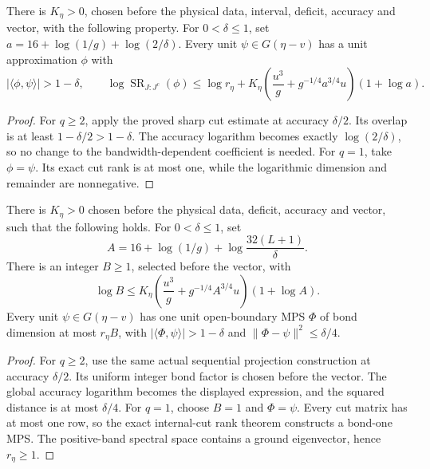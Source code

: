 \begin{lemma}
    \label{lem:ld_sharp_strict_cut_positive_dimension}
    \leanok
    There is $K_\eta>0$, chosen before the physical data, interval,
    deficit, accuracy and vector, with the following property.
    For $0<\delta\le1$, set
    $a=16+\log(1/g)+\log(2/\delta)$.
    Every unit $\psi\in G(\eta-v)$ has a unit approximation $\phi$ with
    \[
        |\langle\phi,\psi\rangle|>1-\delta,\qquad
        \log\operatorname{SR}_{J:J^c}(\phi)
        \le\log r_\eta+
        K_\eta\left(\frac{u^3}{g}+g^{-1/4}a^{3/4}u\right)(1+\log a).
    \]
\end{lemma}
\begin{proof}\leanok
    For $q\ge2$, apply the proved sharp cut estimate at accuracy
    $\delta/2$. Its overlap is at least $1-\delta/2>1-\delta$.
    The accuracy logarithm becomes exactly $\log(2/\delta)$, so no
    change to the bandwidth-dependent coefficient is needed.
    For $q=1$, take $\phi=\psi$. Its exact cut rank is at most one,
    while the logarithmic dimension and remainder are nonnegative.
\end{proof}

\begin{lemma}
    \label{lem:ld_sharp_strict_mps_positive_dimension}
    \leanok
    There is $K_\eta>0$ chosen before the physical data, deficit,
    accuracy and vector, such that the following holds.
    For $0<\delta\le1$, set
    \[
        A=16+\log(1/g)+\log\frac{32(L+1)}\delta.
    \]
    There is an integer $B\ge1$, selected before the vector, with
    \[
        \log B\le K_\eta
        \left(\frac{u^3}{g}+g^{-1/4}A^{3/4}u\right)(1+\log A).
    \]
    Every unit $\psi\in G(\eta-v)$ has one unit open-boundary MPS
    $\Phi$ of bond dimension at most $r_\eta B$, with
    $|\langle\Phi,\psi\rangle|>1-\delta$ and
    $\|\Phi-\psi\|^2\le\delta/4$.
\end{lemma}
\begin{proof}\leanok
    For $q\ge2$, use the same actual sequential projection construction
    at accuracy $\delta/2$. Its uniform integer bond factor is chosen
    before the vector. The global accuracy logarithm becomes the displayed
    expression, and the squared distance is at most $\delta/4$.
    For $q=1$, choose $B=1$ and $\Phi=\psi$.
    Every cut matrix has at most one row, so the exact internal-cut rank
    theorem constructs a bond-one MPS. The positive-band spectral space
    contains a ground eigenvector, hence $r_\eta\ge1$.
\end{proof}

